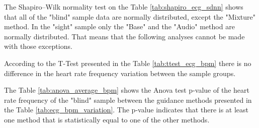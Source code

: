 
%
%    
%
%
%
%
%    
%
The Shapiro–Wilk normality test on the Table \ref{tab:shapiro_ecg_sdnn} shows that all of the "blind" sample data are normally distributed, except the "Mixture" method. In the "sight" sample only the "Base" and the "Audio" method are normally distributed. That means that the following analyses cannot be made with those exceptions.

%

According to the T-Test presented in the Table \ref{tab:ttest_ecg_bpm} there is no difference in the heart rate frequency variation between the sample groups.

%

\begin{table}[!htb]
    \begin{minipage}{.45\linewidth}
        
    \end{minipage}
    \hfill
    \begin{minipage}{.45\linewidth}
        \vspace{-2.75cm}
        
    \end{minipage}
\end{table}

The Table \ref{tab:anova_average_bpm} shows the Anova test p-value of the heart rate frequency of the "blind" sample between the guidance methods presented in the Table \ref{tab:ecg_bpm_variation}. The p-value indicates that there is at least one method that is statistically equal to one of the other methods.

